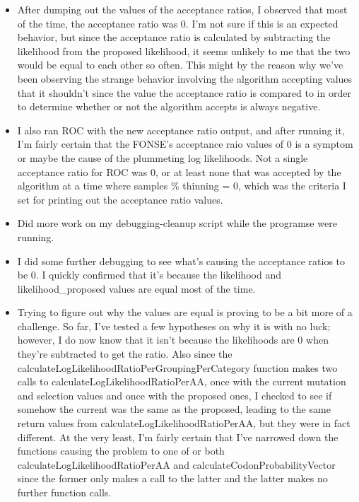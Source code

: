 \documentclass[11pt]{labbook}
\begin{document}
    \begin{itemize}
        \item After dumping out the values of the acceptance ratios, I observed that most of the time, the acceptance ratio was 0. I'm not sure if this is an expected behavior, but since the acceptance ratio is calculated by subtracting the likelihood from the proposed likelihood, it seems unlikely to me that the two would be equal to each other so often. This might by the reason why we've been observing the strange behavior involving the algorithm accepting values that it shouldn't since the value the acceptance ratio is compared to in order to determine whether or not the algorithm accepts is always negative.
        \item I also ran ROC with the new acceptance ratio output, and after running it, I'm fairly certain that the FONSE's acceptance raio values of 0 is a symptom or maybe the cause of the plummeting log likelihoods. Not a single acceptance ratio for ROC was 0, or at least none that was accepted by the algorithm at a time where samples \%  thinning = 0, which was the criteria I set for printing out the acceptance ratio values.
        \item Did more work on my debugging-cleanup script while the programse were running.
    \end{itemize}
    
    \begin{itemize}
        \item I did some further debugging to see what's causing the acceptance ratios to be 0. I quickly confirmed that it's because the likelihood and likelihood\_proposed values are equal most of the time. 
        \item Trying to figure out why the values are equal is proving to be a bit more of a challenge. So far, I've tested a few hypotheses on why it is with no luck; however, I do now know that it isn't because the likelihoods are 0 when they're subtracted to get the ratio. Also since the calculateLogLikelihoodRatioPerGroupingPerCategory function makes two calls to calculateLogLikelihoodRatioPerAA, once with the current mutation and selection values and once with the proposed ones, I checked to see if somehow the current was the same as the proposed, leading to the same return values from calculateLogLikelihoodRatioPerAA, but they were in fact different. At the very least, I'm fairly certain that I've narrowed down the functions causing the problem to one of or both calculateLogLikelihoodRatioPerAA and calculateCodonProbabilityVector since the former only makes a call to the latter and the latter makes no further function calls.
    \end{itemize}
    
\end{document}
